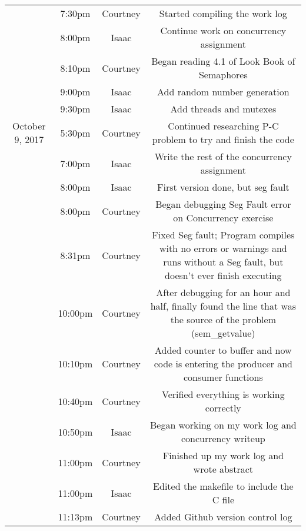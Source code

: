 \documentclass[letterpaper,10pt,draftclsnofoot,onecolumn,titlepage]{IEEEtran}
\begin{document}
\begin{center}
\begin{tabular}{ c c c c }
                 & 7:30pm & Courtney & Started compiling the work log \\
                 & 8:00pm & Isaac & Continue work on concurrency assignment \\
		 & 8:10pm & Courtney & Began reading 4.1 of Look Book of Semaphores \\ 
		 & 9:00pm & Isaac & Add random number generation \\
                 & 9:30pm & Isaac & Add threads and mutexes \\ \hline
 October 9, 2017 & 5:30pm & Courtney & Continued researching P-C problem to try and finish the code \\
 		 & 7:00pm & Isaac & Write the rest of the concurrency assignment \\
	         & 8:00pm & Isaac & First version done, but seg fault \\ 
		 & 8:00pm & Courtney & Began debugging Seg Fault error on Concurrency exercise \\
                 & 8:31pm & Courtney & Fixed Seg fault; Program compiles with no errors or warnings and runs without a Seg fault, but doesn't ever finish executing \\
                 & 10:00pm & Courtney & After debugging for an hour and half, finally found the line that was the source of the problem (sem\_getvalue) \\
                 & 10:10pm & Courtney & Added counter to buffer and now code is entering the producer and consumer functions \\
		 & 10:40pm & Courtney & Verified everything is working correctly \\
		 & 10:50pm & Isaac & Began working on my work log and concurrency writeup\\
		 & 11:00pm & Courtney & Finished up my work log and wrote abstract\\
		 & 11:00pm & Isaac & Edited the makefile to include the C file\\
		 & 11:13pm & Courtney & Added Github version control log\\ \hline
		 
                 
                 
\end{tabular}
\end{center}

%


	
\end{document}
